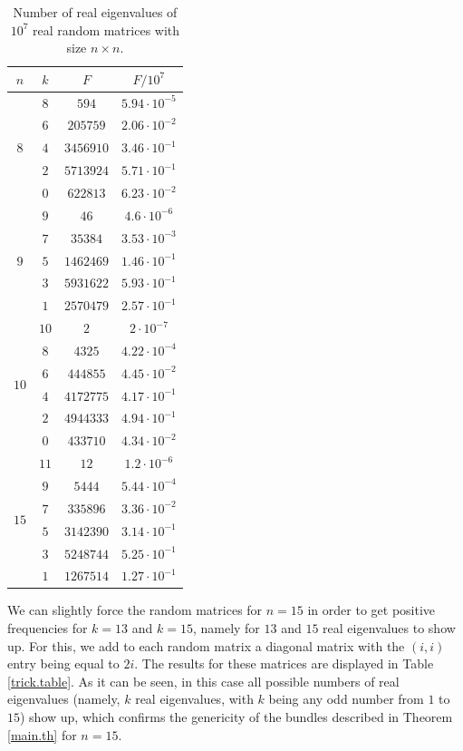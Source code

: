 \documentclass[a4paper]{article}
\begin{document}
\begin{table}[]
    \centering
    \begin{tabular}{|c|c|c|c|}\hline
    $n$&$k$&$F$&$F/10^7$\\\hline\hline
          \multirow{5}{1em}{$8$} & $8$ & $594$&$5.94\cdot10^{-5}$ \\
& $6$ & $205759$&$2.06\cdot10^{-2}$ \\
& $4$ & $3456910$&$3.46\cdot10^{-1}$  \\&$2$ &$5713924$& $5.71\cdot10^{-1}$\\
         &$0$& $622813$&$6.23\cdot10^{-2}$\\\hline
         \multirow{5}{1em}{$9$} & $9$ & $46$&$4.6\cdot10^{-6}$ \\
& $7$ & $35384$&$3.53\cdot10^{-3}$ \\
& $5$ & $1462469$&$1.46\cdot10^{-1}$ \\&$3$ &$5931622$&$5.93\cdot10^{-1}$  \\
         &$1$& $2570479$&$2.57\cdot10^{-1}$\\\hline
          \multirow{6}{1em}{$10$} &$10$&$2$&$2\cdot10^{-7}$\\
          & $8$ & $4325$&$4.22\cdot10^{-4}$ \\
& $6$ & $444855$&$4.45\cdot10^{-2}$ \\
& $4$ & $4172775$&$4.17\cdot10^{-1}$  \\&$2$ &$4944333$& $4.94\cdot10^{-1}$\\
         &$0$& $433710$&$4.34\cdot10^{-2}$\\\hline
         \multirow{6}{1em}{$15$} &$11$&$12$&$1.2\cdot10^{-6}$\\& $9$ & $5444$&$5.44\cdot10^{-4}$ \\
& $7$ & $335896$&$3.36\cdot10^{-2}$ \\
& $5$ & $3142390$&$3.14\cdot10^{-1}$ \\&$3$ &$5248744$&$5.25\cdot10^{-1}$  \\
         &$1$& $1267514$&$1.27\cdot10^{-1}$\\\hline
    \end{tabular}
    \caption{Number of real eigenvalues of $10^7$ real random matrices with size $n\times n$.}
    \label{results.table}
\end{table}

We can slightly force the random matrices for $n=15$ in order to get positive frequencies for $k=13$ and $k=15$, namely for $13$ and $15$ real eigenvalues to show up. For this, we add to each random matrix a diagonal matrix with the $(i,i)$ entry being equal to $2i$. The results for these matrices are displayed in Table \ref{trick.table}. As it can be seen, in this case all possible numbers of real eigenvalues (namely, $k$ real eigenvalues, with $k$ being any odd number from $1$ to $15$) show up, which confirms the genericity of the bundles described in Theorem \ref{main.th} for $n=15$.
\end{document}
